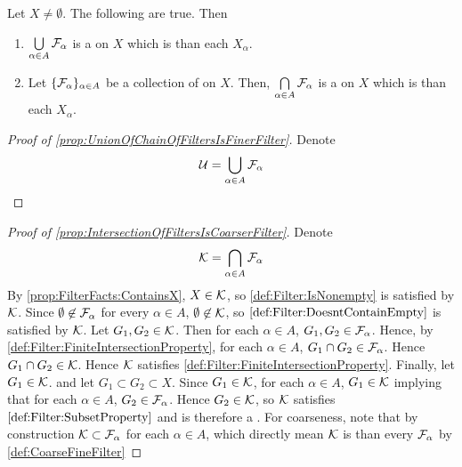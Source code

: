 \begin{prop}
    \label{prop:UnionIntersectionChainOfFiltersIsAFilter}
    Let \(X \neq \emptyset\).
    The following are true. 
    Then 
    \begin{enumerate}[label=(\roman*), ref={\ref{prop:UnionIntersectionChainOfFiltersIsAFilter}~\roman*}]
        \item \label{prop:UnionOfChainOfFiltersIsFinerFilter}
        
        $\bigcup\limits_{\alpha \in A} \mathcal{F}_\alpha$ is a \Filter on $X$ which is \FinerFilter than each $X_\alpha$. 
        \item \label{prop:IntersectionOfFiltersIsCoarserFilter} 
        Let 
        \(\{ \mathcal{F}_\alpha \}_{\alpha \in A}\) be a 
        collection of \Filters on $X$. 
        Then, 
        $\bigcap\limits_{\alpha \in A}\mathcal{F}_\alpha$ is a \Filter on $X$ which is \CoarserFilter than each $X_\alpha$. 
    \end{enumerate}
    \begin{proof}[Proof of \ref{prop:UnionOfChainOfFiltersIsFinerFilter}]
        Denote 
        \begin{equation*}
        \mathcal{U} = \bigcup\limits_{\alpha \in A} \mathcal{F}_\alpha
        \end{equation*}
        
    \end{proof}
    \begin{proof}[Proof of \ref{prop:IntersectionOfFiltersIsCoarserFilter}]
        Denote 
        \begin{equation*}
            \mathcal{K} = \bigcap\limits_{\alpha \in A} \mathcal{F}_{\alpha}
        \end{equation*}
        By \ref{prop:FilterFacts:ContainsX}, $X \in \mathcal{K}$, so \ref{def:Filter:IsNonempty}
        is satisfied by $\mathcal{K}$. 
        Since $\emptyset \not \in \mathcal{F}_\alpha$ for every $\alpha \in A$, $\emptyset \not \in \mathcal{K}$, so $\ref{def:Filter:DoesntContainEmpty}$ is satisfied by $\mathcal{K}$. 
        Let $G_1,G_2 \in \mathcal{K}$. Then for each $\alpha \in A$, $G_1,G_2 \in \mathcal{F}_\alpha$. 
        Hence, by \ref{def:Filter:FiniteIntersectionProperty}, for each $\alpha \in A$, 
        $G_1 \cap G_2 \in \mathcal{F}_\alpha$. Hence $G_1 \cap G_2 \in \mathcal{K}$. 
        Hence $\mathcal{K}$ satisfies \ref{def:Filter:FiniteIntersectionProperty}. 
        Finally, let $G_1 \in \mathcal{K}$. and let $G_1 \subset G_2 \subset X$. 
        Since $G_1 \in \mathcal{K}$, for each $\alpha \in A$, $G_1 \in \mathcal{K}$ implying that for each 
        $\alpha \in A$, $G_2 \in \mathcal{F}_\alpha$. 
        Hence $G_2 \in \mathcal{K}$, so $\mathcal{K}$ satisfies $\ref{def:Filter:SubsetProperty}$
        and is therefore a \Filter. 
        For coarseness, note that by construction 
        $\mathcal{K} \subset \mathcal{F}_\alpha $ for each $\alpha \in A$, which directly mean $\mathcal{K}$ is 
        \CoarserFilter than every $\mathcal{F}_\alpha$ by \ref{def:CoarseFineFilter}
    \end{proof}
\end{prop}
